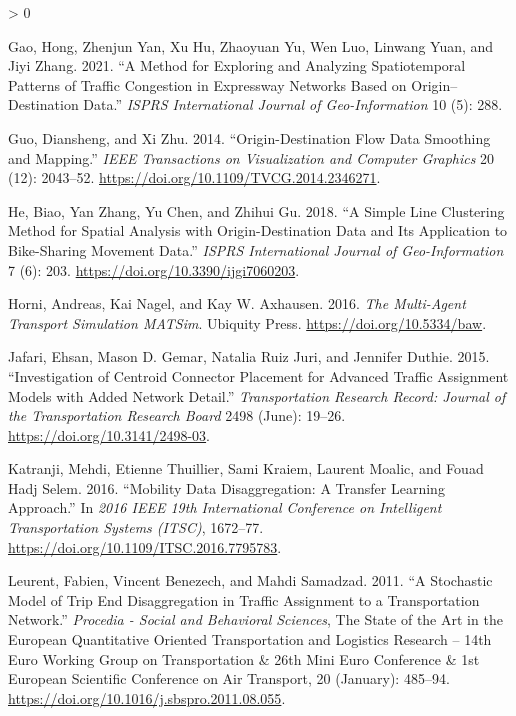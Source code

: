 \documentclass[
]{article}
\newlength{\cslhangindent}
\newenvironment{CSLReferences}[2] %
 {%
  \setlength{\parindent}{0pt}
  \ifodd #1 \everypar{\setlength{\hangindent}{\cslhangindent}}\ignorespaces\fi
  \ifnum #2 > 0
  \setlength{\parskip}{#2\baselineskip}
  \fi
 }%
 {}
\begin{document}
\begin{CSLReferences}{1}{0}
\leavevmode\hypertarget{ref-gao_method_2021}{}%
Gao, Hong, Zhenjun Yan, Xu Hu, Zhaoyuan Yu, Wen Luo, Linwang Yuan, and Jiyi Zhang. 2021. {``A {Method} for {Exploring} and {Analyzing Spatiotemporal Patterns} of {Traffic Congestion} in {Expressway Networks Based} on {Origin}--{Destination Data}.''} \emph{ISPRS International Journal of Geo-Information} 10 (5): 288.

\leavevmode\hypertarget{ref-guo_origindestination_2014}{}%
Guo, Diansheng, and Xi Zhu. 2014. {``Origin-{Destination Flow Data Smoothing} and {Mapping}.''} \emph{IEEE Transactions on Visualization and Computer Graphics} 20 (12): 2043--52. \url{https://doi.org/10.1109/TVCG.2014.2346271}.

\leavevmode\hypertarget{ref-he_simple_2018}{}%
He, Biao, Yan Zhang, Yu Chen, and Zhihui Gu. 2018. {``A {Simple Line Clustering Method} for {Spatial Analysis} with {Origin-Destination Data} and {Its Application} to {Bike-Sharing Movement Data}.''} \emph{ISPRS International Journal of Geo-Information} 7 (6): 203. \url{https://doi.org/10.3390/ijgi7060203}.

\leavevmode\hypertarget{ref-horni_multiagent_2016}{}%
Horni, Andreas, Kai Nagel, and Kay W. Axhausen. 2016. \emph{The {Multi-Agent Transport Simulation MATSim}}. {Ubiquity Press}. \url{https://doi.org/10.5334/baw}.

\leavevmode\hypertarget{ref-jafari_investigation_2015}{}%
Jafari, Ehsan, Mason D. Gemar, Natalia Ruiz Juri, and Jennifer Duthie. 2015. {``Investigation of {Centroid Connector Placement} for {Advanced Traffic Assignment Models} with {Added Network Detail}.''} \emph{Transportation Research Record: Journal of the Transportation Research Board} 2498 (June): 19--26. \url{https://doi.org/10.3141/2498-03}.

\leavevmode\hypertarget{ref-katranji_mobility_2016}{}%
Katranji, Mehdi, Etienne Thuillier, Sami Kraiem, Laurent Moalic, and Fouad Hadj Selem. 2016. {``Mobility Data Disaggregation: {A} Transfer Learning Approach.''} In \emph{2016 {IEEE} 19th {International Conference} on {Intelligent Transportation Systems} ({ITSC})}, 1672--77. \url{https://doi.org/10.1109/ITSC.2016.7795783}.

\leavevmode\hypertarget{ref-leurent_stochastic_2011}{}%
Leurent, Fabien, Vincent Benezech, and Mahdi Samadzad. 2011. {``A Stochastic Model of Trip End Disaggregation in Traffic Assignment to a Transportation Network.''} \emph{Procedia - Social and Behavioral Sciences}, The {State} of the {Art} in the {European Quantitative Oriented Transportation} and {Logistics Research} -- 14th {Euro Working Group} on {Transportation} \& 26th {Mini Euro Conference} \& 1st {European Scientific Conference} on {Air Transport}, 20 (January): 485--94. \url{https://doi.org/10.1016/j.sbspro.2011.08.055}.


\end{CSLReferences}
\end{document}
